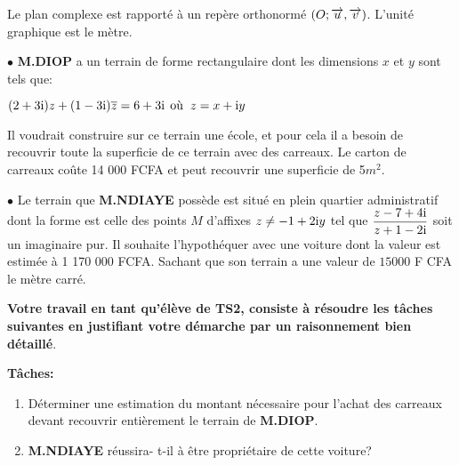 \begin{exercice}
Le plan complexe est rapporté à un repère  orthonormé $ (O ;\overrightarrow{u},\overrightarrow{v}) $. L'unité graphique est le mètre.
\medskip

$ \bullet $  \textbf{M.DIOP} a un terrain de forme rectangulaire  dont les dimensions $x$ et $y$ sont tels que:
\medskip

 $ (2+3\text{i})z+(1-3\text{i})\overline{z} =6+3\text{i} \:\:\text{où}\;\; z=x+\text{i} y $ 

\medskip

 Il voudrait construire sur ce terrain une école, et pour cela il a besoin de recouvrir  toute la superficie de ce terrain avec des carreaux. Le carton de carreaux coûte 14 000 FCFA et peut recouvrir une superficie de 5$m^2$.


\medskip


$ \bullet $ Le terrain que  \textbf{M.NDIAYE}  possède est situé en plein  quartier administratif  dont la forme est celle des points $ M $ d'affixes $ z\neq -1+2\text{i} y $ tel que \; $ \dfrac{z-7+4\text{i}}{z+1-2\text{i}}$ soit un imaginaire pur. Il souhaite l'hypothéquer  avec une voiture dont la valeur est estimée à 1 170 000 FCFA. Sachant que son terrain a une valeur de $ 15000$  F CFA le mètre carré.

\medskip

\textbf{Votre travail en tant qu'élève de TS2, consiste à résoudre les tâches suivantes en justifiant votre démarche par un raisonnement bien détaillé}.

\medskip

\textbf{Tâches:}
\begin{enumerate}
\item Déterminer une estimation du montant nécessaire pour l'achat des carreaux devant recouvrir entièrement le terrain de  \textbf{M.DIOP}.
\item \textbf{M.NDIAYE}  réussira- t-il à être propriétaire de cette voiture? 
\end{enumerate}
\end{exercice}


